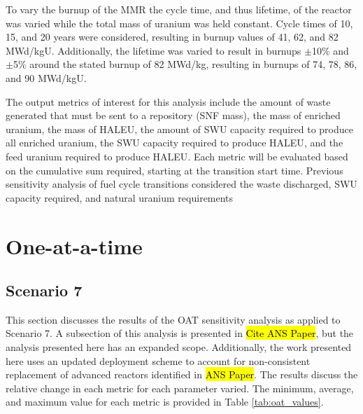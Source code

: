 To vary the burnup of the \gls{MMR} the cycle time, and thus lifetime, of 
the reactor was varied while the total mass of uranium was held constant. 
Cycle times of 10, 15, and 20 years were considered, resulting in burnup 
values of 41, 62, and 82 MWd/kgU. Additionally, the lifetime was varied to 
result in burnups $\pm$10\% and $\pm$5\% around the stated burnup of 
82 MWd/kg, resulting in burnups of 74, 78, 86, and 90 MWd/kgU. 

The output metrics of 
interest for this analysis include the amount of waste generated that 
must be sent to a repository (\gls{SNF} mass), the mass of enriched uranium, 
the mass of \gls{HALEU},
the amount of \gls{SWU} capacity required to produce all enriched uranium, the 
\gls{SWU} capacity required to produce \gls{HALEU}, and the feed uranium 
required to produce \gls{HALEU}. Each metric will be evaluated based on the 
cumulative sum required, starting at the transition start time. Previous 
sensitivity analysis of fuel cycle transitions considered the waste 
discharged, \gls{SWU} 
capacity required, and natural uranium requirements
\cite{richards_application_2021,feng_sensitivity_2020} 


\section{One-at-a-time}
\subsection{Scenario 7}
This section discusses the results of the \gls{OAT} sensitivity analysis 
as applied to Scenario 7. A subsection of this analysis is presented 
in \hl{Cite ANS Paper}, but the analysis presented here has an expanded scope. 
Additionally, the work presented here uses an updated deployment scheme to 
account for non-consistent replacement of advanced reactors identified in 
\hl{ANS Paper}. The results discuss
the relative change in each metric for each parameter varied. The minimum, 
average, and maximum value for each metric is provided in Table 
\ref{tab:oat_values}.

